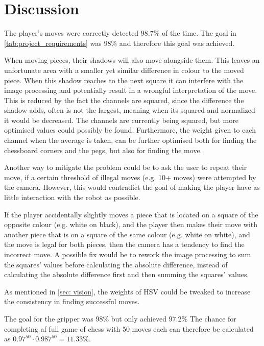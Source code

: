 \section{Discussion}


The player's moves were correctly detected $98.7 \%$ of the time. The goal in \cref{tab:project_requirements} was $98 \%$ and therefore this goal was achieved.

When moving pieces, their shadows will also move alongside them. This leaves an unfortunate area with a smaller yet similar difference in colour to the moved piece. When this shadow reaches to the next square it can interfere with the image processing and potentially result in a wrongful interpretation of the move. This is reduced by the fact the channels are squared, since the difference the shadow adds, often is not the largest, meaning when its squared and normalized it would be decreased. The channels are currently being squared, but more optimised values could possibly be found. Furthermore, the weight given to each channel when the average is taken, can be further optimised both for finding the chessboard corners and the pegs, but also for finding the move.

Another way to mitigate the problem could be to ask the user to repeat their move, if a certain threshold of illegal moves (e.g. 10+ moves) were attempted by the camera. However, this would contradict the goal of making the player have as little interaction with the robot as possible.

If the player accidentally slightly moves a piece that is located on a square of the opposite colour (e.g. white on black), and the player then makes their move with another piece that is on a square of the same colour (e.g. white on white), and the move is legal for both pieces, then the camera has a tendency to find the incorrect move. A possible fix would be to rework the image processing to sum the squares' values before calculating the absolute difference, instead of calculating the absolute difference first and then summing the squares' values.

As mentioned in \cref{sec: vision}, the weights of HSV could be tweaked to increase the consistency in finding successful moves.

The goal for the gripper was $98 \%$ but only achieved $97.2 \%$
The chance for completing af full game of chess with 50 moves each can therefore be calculated as $0.97^{50} \cdot 0.987^{50}=11.33 \%$.

